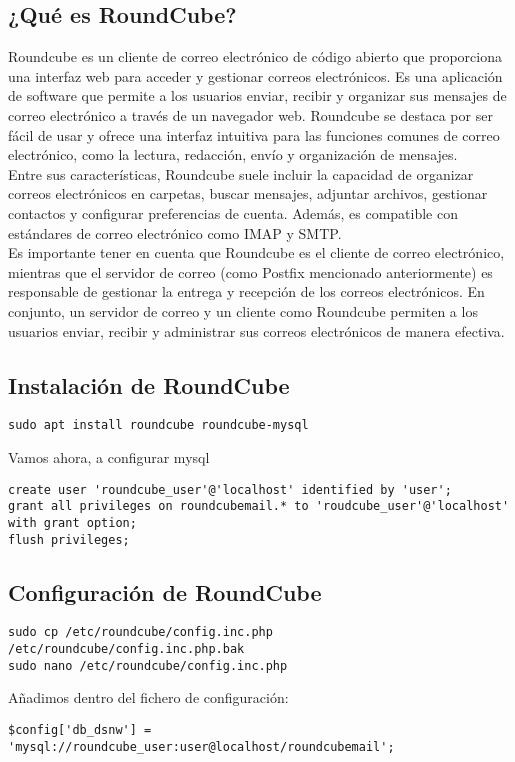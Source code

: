 \documentclass{article}
\begin{document}
\subsection{¿Qué es RoundCube?}

Roundcube es un cliente de correo electrónico de código abierto que proporciona una interfaz web para acceder y gestionar correos electrónicos. Es una aplicación de software que permite a los usuarios enviar, recibir y organizar sus mensajes de correo electrónico a través de un navegador web. Roundcube se destaca por ser fácil de usar y ofrece una interfaz intuitiva para las funciones comunes de correo electrónico, como la lectura, redacción, envío y organización de mensajes.\\


Entre sus características, Roundcube suele incluir la capacidad de organizar correos electrónicos en carpetas, buscar mensajes, adjuntar archivos, gestionar contactos y configurar preferencias de cuenta. Además, es compatible con estándares de correo electrónico como IMAP y SMTP.\\


Es importante tener en cuenta que Roundcube es el cliente de correo electrónico, mientras que el servidor de correo (como Postfix mencionado anteriormente) es responsable de gestionar la entrega y recepción de los correos electrónicos. En conjunto, un servidor de correo y un cliente como Roundcube permiten a los usuarios enviar, recibir y administrar sus correos electrónicos de manera efectiva.

\subsection{Instalación de RoundCube}
\lstset{language=Bash, breaklines=true, basicstyle=\footnotesize}
\begin{lstlisting}[frame=single]
sudo apt install roundcube roundcube-mysql
\end{lstlisting}
Vamos ahora, a configurar mysql
\lstset{language=Bash, breaklines=true, basicstyle=\footnotesize}
\begin{lstlisting}[frame=single]
create user 'roundcube_user'@'localhost' identified by 'user';
grant all privileges on roundcubemail.* to 'roudcube_user'@'localhost' with grant option;
flush privileges;
\end{lstlisting}

\subsection{Configuración de RoundCube}
\lstset{language=Bash, breaklines=true, basicstyle=\footnotesize}
\begin{lstlisting}[frame=single]
sudo cp /etc/roundcube/config.inc.php /etc/roundcube/config.inc.php.bak
sudo nano /etc/roundcube/config.inc.php
\end{lstlisting}

Añadimos dentro del fichero de configuración:

\begin{lstlisting}[frame=single]
$config['db_dsnw'] = 'mysql://roundcube_user:user@localhost/roundcubemail';
\end{lstlisting}
\end{document}
